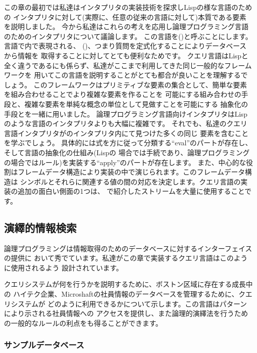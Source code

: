 この章の最初では私達はインタプリタの実装技術を探求しLispの様な言語のための
インタプリタに対して(実際に、任意の従来の言語に対して)本質である要素を説明しました。
今から私達はこれらの考えを応用し論理プログラミング言語のためのインタプリタについて議論します。
この言語を()と呼ぶことにします。言語で内で表現される、
()、つまり質問を定式化することによりデータベースから情報を
取得することに対してとても便利なためです。
クエリ言語はLispと全く違うであるにも係らず、私達がここまで利用してきた同じ一般的なフレームワークを
用いてこの言語を説明することがとても都合が良いことを理解するでしょう。
このフレームワークはプリミティブな要素の集合として、簡単な要素を組み合わせることでより複雑な要素を作ることを
可能にする組み合わせの手段と、複雑な要素を単純な概念の単位として見做すことを可能にする
抽象化の手段とを一緒に用いました。
論理プログラミング言語向けインタプリタはLispのような言語のインタプリタよりも大幅に複雑です。
それでも、私達のクエリ言語インタプリタがのインタプリタ内にて見つけた多くの同じ
要素を含むことを学ぶでしょう。
具体的には式を方に従って分類する``eval''のパートが存在し、そして言語の抽象化の仕組み(Lispの
場合では手続であり、論理プログラミングの場合ではルール)を実装する``apply''のパートが存在します。
また、中心的な役割はフレームデータ構造により実装の中で演じられます。このフレームデータ構造は
シンボルとそれらに関連する値の間の対応を決定します。クエリ言語の実装の追加の面白い側面の1つは、
で紹介したストリームを大量に使用することです。



\subsection{演繹的情報検索}
\label{Section 4.4.1}

論理プログラミングは情報取得のためのデータベースに対するインターフェイスの提供に
おいて秀でています。私達がこの章で実装するクエリ言語はこのように使用されるよう
設計されています。


クエリシステムが何を行うかを説明するために、ボストン区域に存在する成長中の
ハイテク企業、Microshaftの社員情報のデータベースを管理するために、クエリシステムが
どのように利用できるかについて示します。この言語はパターンにより示される社員情報への
アクセスを提供し、また論理的演繹法を行うための一般的なルールの利点をも得ることができます。

\subsubsection*{サンプルデータベース}

